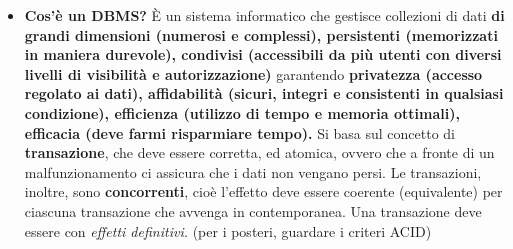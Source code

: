 \documentclass{article}
\begin{document}
\begin{itemize}
    \item \textbf{Cos'è un DBMS?} È un sistema informatico che gestisce collezioni di dati \textbf{di grandi dimensioni (numerosi e complessi), persistenti (memorizzati in maniera durevole), condivisi (accessibili da più utenti con diversi livelli di visibilità e autorizzazione)} garantendo \textbf{privatezza (accesso regolato ai dati), affidabilità (sicuri, integri e consistenti in qualsiasi condizione), efficienza (utilizzo di tempo e memoria ottimali), efficacia (deve farmi risparmiare tempo).} Si basa sul concetto di \textbf{transazione}, che deve essere corretta, ed atomica, ovvero che a fronte di un malfunzionamento ci assicura che i dati non vengano persi. Le transazioni, inoltre, sono \textbf{concorrenti}, cioè l'effetto deve essere coerente (equivalente) per ciascuna transazione che avvenga in contemporanea. Una transazione deve essere con \textit{effetti definitivi.} (per i posteri, guardare i criteri ACID)

\end{itemize}
\end{document}
